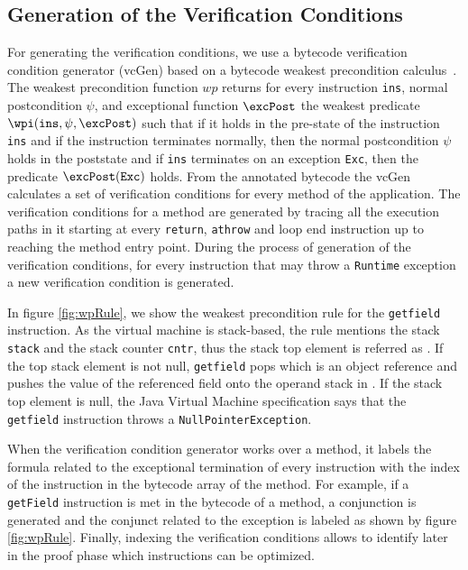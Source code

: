 







\subsection{Generation of the Verification Conditions}
\label{vcGen}
For generating the verification conditions, we use a bytecode verification condition generator (vcGen) based on a bytecode weakest precondition calculus~\cite{JBL05MP}. The weakest precondition function $wp$ returns for every instruction \texttt{ins}, normal postcondition $\psi$, and exceptional function $\excPost$ the weakest predicate \\ $\wpi( \texttt{ins} ,\psi ,\excPost)$ such that if it holds in the pre-state of the instruction \texttt{ins} and if the instruction terminates normally, then the normal postcondition $\psi$ holds in the poststate and if \texttt{ins} terminates on an exception \texttt{Exc}, then the predicate $\excPost(\texttt{Exc})$ holds. From the annotated bytecode the vcGen calculates a set of verification conditions for every method of the application. The verification conditions for a method are generated by tracing all the execution paths in it starting at every \texttt{return}, \texttt{athrow} and loop end instruction up to reaching the method entry point. During the process of generation of the verification conditions, for every instruction that may throw a \verb!Runtime! exception a new verification condition is generated.

In figure \ref{fig:wpRule}, we show the weakest precondition rule for the \texttt{getfield} instruction. As the virtual machine is stack-based, the rule mentions the stack \texttt{stack} and the stack counter \texttt{cntr}, thus the stack top element is referred as \stack{\counter}. If the top stack element \stack{\counter} is not null, \texttt{getfield} pops \stack{\counter} which is an object reference and pushes the value of the referenced field onto the operand stack in \stack{\counter}. If the stack top element is null, the Java Virtual Machine specification says that the \texttt{getfield} instruction throws a \texttt{NullPointerException}.

When the verification condition generator works over a method, it labels the formula related to the exceptional termination of every instruction with the index of the instruction in the bytecode array of the method. For example, if a \texttt{getField} instruction is met in the bytecode of a method, a conjunction is generated and the conjunct related to the exception is labeled as shown by figure \ref{fig:wpRule}. Finally, indexing the verification conditions allows to identify later in the proof phase which instructions can be optimized.



